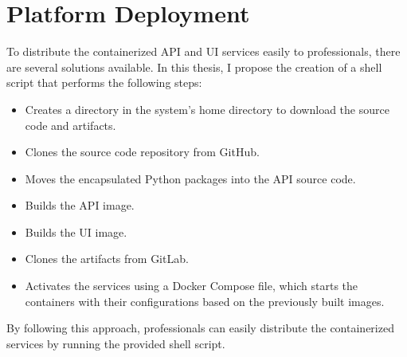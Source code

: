 \section{Platform Deployment}

To distribute the containerized API and UI services easily to professionals,
there are several solutions available. In this thesis, I propose the creation
of a shell script that performs the following steps:

\begin{itemize}
  \item Creates a directory in the system's home directory to download the source code and artifacts.
  \item Clones the source code repository from GitHub.
  \item Moves the encapsulated Python packages into the API source code.
  \item Builds the API image.
  \item Builds the UI image.
  \item Clones the artifacts from GitLab.
  \item Activates the services using a Docker Compose file, which starts the containers with their configurations based on the previously built images.
\end{itemize}

By following this approach, professionals can easily distribute the
containerized services by running the provided shell script.
